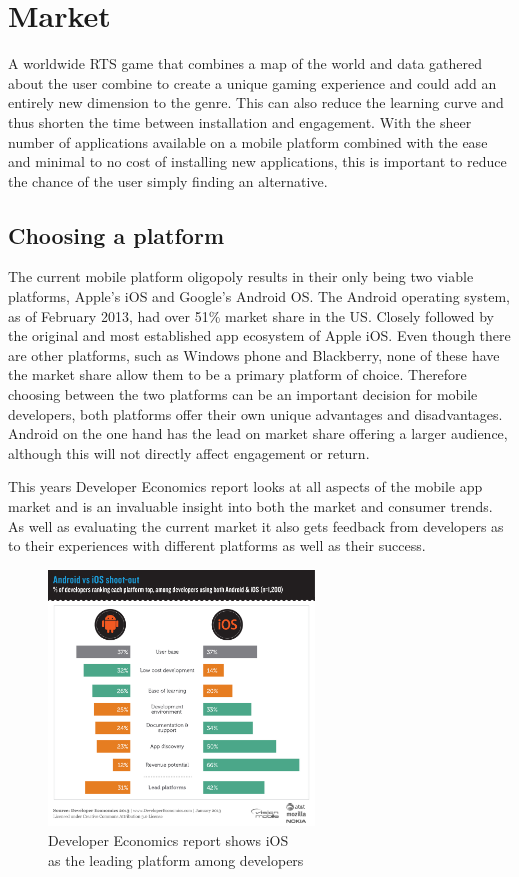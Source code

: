 \section{Market}

A worldwide RTS game that combines a map of the world and data gathered about the user combine to create a unique gaming experience and could add an entirely new dimension to the genre. This can also reduce the learning curve and thus shorten the time between installation and engagement. With the sheer number of applications available on a mobile platform combined with the ease and minimal to no cost of installing new applications, this is important to reduce the chance of the user simply finding an alternative.

\subsection{Choosing a platform}
The current mobile platform oligopoly results in their only being two viable platforms, Apple's iOS and Google's Android OS. The Android operating system, as of February 2013, had over 51\% market share in the US\cite{smartphone_market}. Closely followed by the original and most established app ecosystem of Apple iOS. Even though there are other platforms, such as Windows phone and Blackberry, none of these have the market share allow them to be a primary platform of choice. Therefore choosing between the two platforms can be an important decision for mobile developers, both platforms offer their own unique advantages and disadvantages. Android on the one hand has the lead on market share offering a larger audience, although this will not directly affect engagement or return.

This years Developer Economics report\cite{de} looks at all aspects of the mobile app market and is an invaluable insight into both the market and consumer trends. As well as evaluating the current market it also gets feedback from developers as to their experiences with different platforms as well as their success.

\begin{figure}[H]
  \centering
   \includegraphics[width=0.63\textwidth]{Images/android_ios.png}
  \caption{Developer Economics report\cite{de} shows iOS\\as the leading platform among developers}
  \label{fig:de}
\end{figure}

